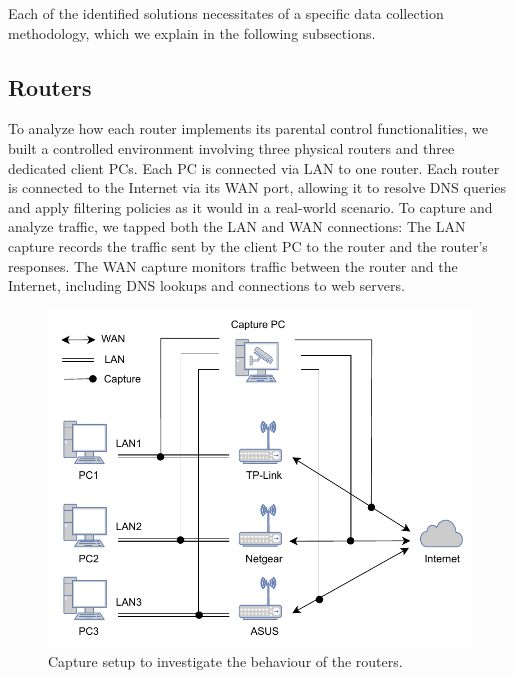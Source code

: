 
Each of the identified solutions necessitates of a specific data collection methodology, which we explain in the following subsections.


\subsection{Routers}
To analyze how each router implements its parental control functionalities, we built a controlled environment involving three physical routers and three dedicated client PCs. Each PC is connected via LAN to one router.
Each router is connected to the Internet via its WAN port, allowing it to resolve DNS queries and apply filtering policies as it would in a real-world scenario.
To capture and analyze traffic, we tapped both the LAN and WAN connections:
The LAN capture records the traffic sent by the client PC to the router and the router's responses.
The WAN capture monitors traffic between the router and the Internet, including DNS lookups and connections to web servers.

\begin{figure}[htbp]
    \centering
    \includegraphics[width=0.9\linewidth]{Images/Methodology/capture.pdf}
    \caption{Capture setup to investigate the behaviour of the routers.}
    \label{fig:capture}
\end{figure}

